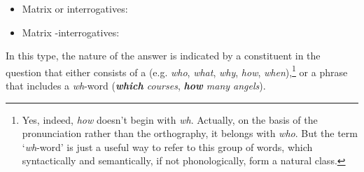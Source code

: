 \documentclass{article}
\begin{document}
\begin{itemize}
\item Matrix  or  interrogatives:
\begin{exe}
\end{exe}
\item Matrix -interrogatives:
\begin{exe}
\end{exe}
\end{itemize}
In this type, the nature of the answer is indicated by a constituent in the question that either consists of a  (e.g. \emph{who}, \emph{what}, \emph{why}, \emph{how}, \emph{when}),\footnote{Yes, indeed, \emph{how} doesn't begin with \emph{wh}.
Actually, on the basis of the pronunciation rather than the orthography, it belongs with \emph{who}.
But the term `\emph{wh}-word' is just a useful way to refer to this group of words, which syntactically and semantically, if not phonologically, form a natural class.} or a phrase that includes a \emph{wh}-word (\emph{\textbf{which} courses}, \emph{\textbf{how} many angels}). 
\end{document}
